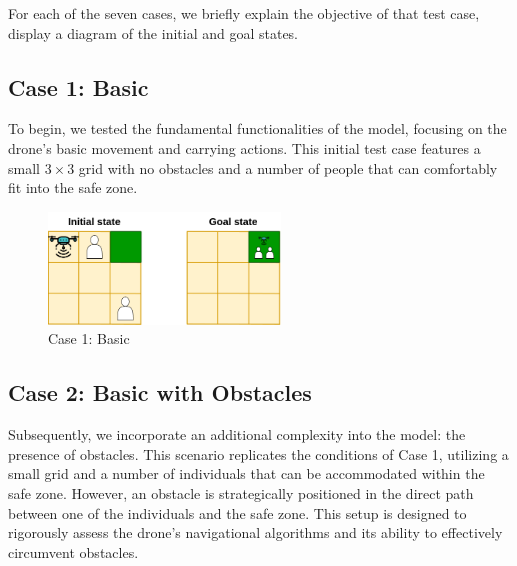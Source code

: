 \documentclass{article}
\begin{document}
For each of the seven cases, we briefly explain the objective of that test case, display a diagram of the initial and goal states.


\subsection{Case 1: Basic}

To begin, we tested the fundamental functionalities of the model, focusing on the drone's basic movement and carrying actions. This initial test case features a small \(3 \times 3\) grid with no obstacles and a number of people that can comfortably fit into the safe zone.

\begin{figure}[ht]
    \centering
    \includegraphics[width=0.55\textwidth]{assets/problem-1-basic.drawio.png}
    \caption{Case 1: Basic}
    \label{fig:initial-state}
\end{figure}

\FloatBarrier

\subsection{Case 2: Basic with Obstacles}

Subsequently, we incorporate an additional complexity into the model: the presence of obstacles. This scenario replicates the conditions of Case 1, utilizing a small grid and a number of individuals that can be accommodated within the safe zone. However, an obstacle is strategically positioned in the direct path between one of the individuals and the safe zone. This setup is designed to rigorously assess the drone's navigational algorithms and its ability to effectively circumvent obstacles.
\end{document}
